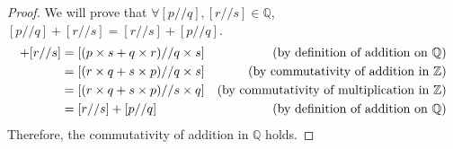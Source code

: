 \documentclass[10pt]{article}
\newcommand{\Z}{\mathbb{Z}}
\newcommand{\Q}{\mathbb{Q}}
\newenvironment{problem}[2][Problem]{\begin{trivlist}
\item[\hskip \labelsep {\bfseries #1}\hskip \labelsep {\bfseries #2.}]}{\end{trivlist}}
\begin{document}
\begin{problem}{1}
\begin{enumerate}
            \begin{proof}
                We will prove that $\forall [p // q], [r // s] \in \Q$, $[p // q] + [r // s] = [r // s] + [p // q]$.
                \begin{align*}
                    [p // q] + [r // s] &= [(p \times s + q \times r) // q \times s] & \text{(by definition of addition on $\Q$)} \hfill \\
                                        &= [(r \times q + s \times p) // q \times s] & \text{(by commutativity of addition in $\Z$)} \hfill \\
                                        &= [(r \times q + s \times p) // s \times q] & \text{(by commutativity of multiplication in $\Z$)} \hfill \\
                                        &= [r // s] + [p // q] & \text{(by definition of addition on $\Q$)} \hfill
                \end{align*}
                Therefore, the commutativity of addition in $\Q$ holds.
            \end{proof}
	\end{enumerate}
\end{problem}
\medskip
\end{document}
